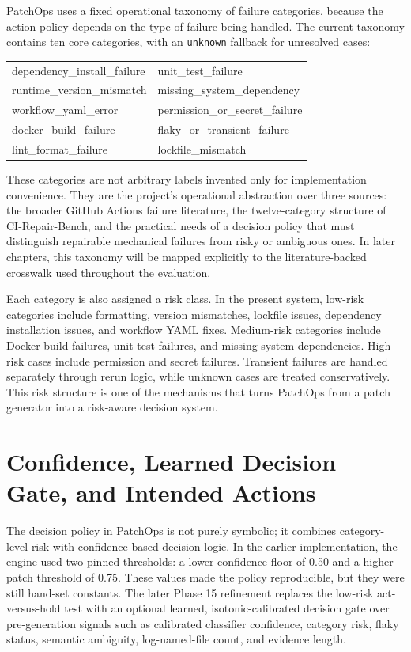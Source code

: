 PatchOps uses a fixed operational taxonomy of failure categories, because the action policy depends on the type
of failure being handled. The current taxonomy contains ten core categories, with an \texttt{unknown} fallback
for unresolved cases:

\begin{center}
\small
\begin{tabularx}{0.92\textwidth}{
  >{\ttfamily\raggedright\arraybackslash}X
  >{\ttfamily\raggedright\arraybackslash}X
}
dependency\_install\_failure & unit\_test\_failure \\
runtime\_version\_mismatch & missing\_system\_dependency \\
workflow\_yaml\_error & permission\_or\_secret\_failure \\
docker\_build\_failure & flaky\_or\_transient\_failure \\
lint\_format\_failure & lockfile\_mismatch \\
\end{tabularx}
\end{center}

These categories are not arbitrary labels invented only for implementation convenience. They are the project's
operational abstraction over three sources: the broader GitHub Actions failure literature, the twelve-category
structure of CI-Repair-Bench, and the practical needs of a decision policy that must distinguish repairable
mechanical failures from risky or ambiguous ones. In later chapters, this taxonomy will be mapped explicitly to
the literature-backed crosswalk used throughout the evaluation.

Each category is also assigned a risk class. In the present system, low-risk categories include formatting,
version mismatches, lockfile issues, dependency installation issues, and workflow YAML fixes. Medium-risk
categories include Docker build failures, unit test failures, and missing system dependencies. High-risk cases
include permission and secret failures. Transient failures are handled separately through rerun logic, while
unknown cases are treated conservatively. This risk structure is one of the mechanisms that turns PatchOps from
a patch generator into a risk-aware decision system.

\section{Confidence, Learned Decision Gate, and Intended Actions}

The decision policy in PatchOps is not purely symbolic; it combines category-level risk with confidence-based
decision logic. In the earlier implementation, the engine used two pinned thresholds: a lower confidence floor
of 0.50 and a higher patch threshold of 0.75. These values made the policy reproducible, but they were still
hand-set constants. The later Phase 15 refinement replaces the low-risk act-versus-hold test with an optional
learned, isotonic-calibrated decision gate over pre-generation signals such as calibrated classifier
confidence, category risk, flaky status, semantic ambiguity, log-named-file count, and evidence length.

